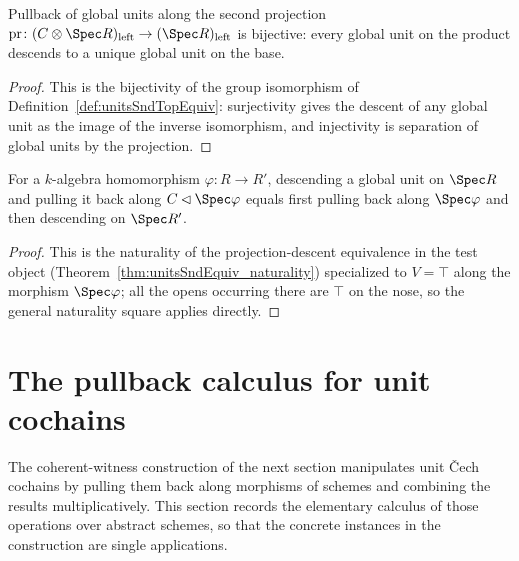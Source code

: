 \begin{theorem}
  \label{thm:appTop_units_bijective}
  \leanok
  Pullback of global units along the second projection \(\mathrm{pr} \colon (C \otimes \Spec
  R)_{\mathrm{left}} \to (\Spec R)_{\mathrm{left}}\) is bijective: every global unit on the
  product descends to a unique global unit on the base.
\end{theorem}
\begin{proof}
  \leanok
  This is the bijectivity of the group isomorphism of
  Definition~\ref{def:unitsSndTopEquiv}: surjectivity gives the descent of any global unit as
  the image of the inverse isomorphism, and injectivity is separation of global units by the
  projection.
\end{proof}

\begin{theorem}
  \label{thm:unitsSndTopEquiv_naturality}
  \leanok
  For a \(k\)-algebra homomorphism \(\varphi \colon R \to R'\), descending a global unit on
  \(\Spec R\) and pulling it back along \(C \lhd \Spec\varphi\) equals first pulling back along
  \(\Spec\varphi\) and then descending on \(\Spec R'\).
\end{theorem}
\begin{proof}
  \leanok
  This is the naturality of the projection-descent equivalence in the test object
  (Theorem~\ref{thm:unitsSndEquiv_naturality}) specialized to \(V = \top\) along the morphism
  \(\Spec\varphi\); all the opens occurring there are \(\top\) on the nose, so the general
  naturality square applies directly.
\end{proof}

\section{The pullback calculus for unit cochains}
\label{sec:cochainPullback}

The coherent-witness construction of the next section manipulates unit \v Cech cochains by
pulling them back along morphisms of schemes and combining the results multiplicatively. This
section records the elementary calculus of those operations over abstract schemes, so that the
concrete instances in the construction are single applications.

